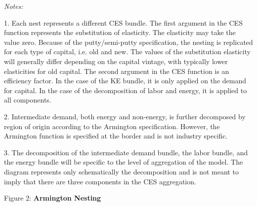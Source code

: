 \documentclass{article}
\begin{document}
\textit{Notes:}
\begin{footnotesize}

1.\hspace{10pt} Each nest represents a different CES bundle. The first argument in the CES function represents the substitution of elasticity. The elasticity may take the value zero. Because of the putty/semi-putty specification, the nesting is replicated for each type of capital, i.e. old and new. The values of the substitution elasticity will generally differ depending on the capital vintage, with typically lower elasticities for old capital. The second argument in the CES function is an efficiency factor. In the case of the KE bundle, it is only applied on the demand for capital. In the case of the decomposition of labor and energy, it is applied to all components.

2.\hspace{10pt} Intermediate demand, both energy and non-energy, is further decomposed by region of origin according to the Armington specification. However, the Armington function is specified at the border and is not industry specific.

3.\hspace{10pt} The decomposition of the intermediate demand bundle, the labor bundle, and the energy bundle will be specific to the level of aggregation of the model. The diagram represents only schematically the decomposition and is not meant to imply that there are three components in the CES aggregation.

\end{footnotesize}

\newpage

\begin{center}

Figure 2: \textbf{Armington Nesting}

\vspace{20pt}
\begin{scriptsize}
\end{scriptsize}
\end{center}
\end{document}
